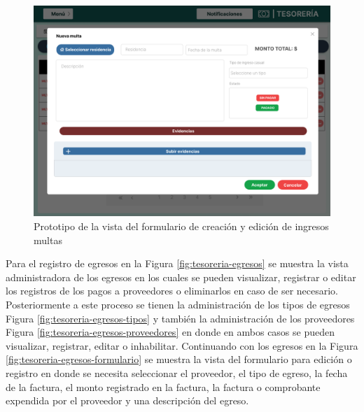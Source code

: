 \begin{figure}[H]
    \centering
    \includegraphics[width=1\textwidth]{resources/images/tesoreia - ingresos - multas -formulario}
    \caption{Prototipo de la vista del formulario de creación y edición de ingresos multas}
    \label{fig:tesoreria-ingresos-multas-formulario}
\end{figure}

Para el registro de egresos en la Figura \ref{fig:tesoreria-egresos} se muestra la vista administradora de los egresos en los cuales se pueden visualizar, registrar o editar los registros de los pagos a proveedores o eliminarlos en caso de ser necesario.
Posteriormente a este proceso se tienen la administración de los tipos de egresos Figura \ref{fig:tesoreria-egresos-tipos} y también la administración de los proveedores Figura \ref{fig:tesoreria-egresos-proveedores} en donde en ambos casos se pueden visualizar, registrar, editar o inhabilitar.
Continuando con los egresos en la Figura \ref{fig:tesoreria-egresos-formulario} se muestra la vista del formulario para edición o registro en donde se necesita seleccionar el proveedor, el tipo de egreso, la fecha de la factura, el monto registrado en la factura, la factura o comprobante expendida por el proveedor y una descripción del egreso.

